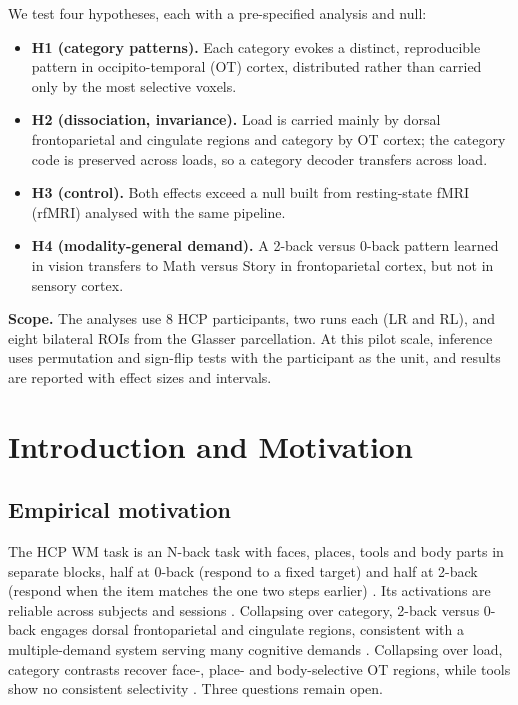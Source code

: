 \documentclass[conference]{IEEEtran}
\newcommand{\Nsub}{8}
\begin{document}
We test four hypotheses, each with a pre-specified analysis and null:
\begin{itemize}
\item \textbf{H1 (category patterns).} Each category evokes a distinct, reproducible pattern in occipito-temporal (OT) cortex, distributed rather than carried only by the most selective voxels.
\item \textbf{H2 (dissociation, invariance).} Load is carried mainly by dorsal frontoparietal and cingulate regions and category by OT cortex; the category code is preserved across loads, so a category decoder transfers across load.
\item \textbf{H3 (control).} Both effects exceed a null built from resting-state fMRI (rfMRI) analysed with the same pipeline.
\item \textbf{H4 (modality-general demand).} A 2-back versus 0-back pattern learned in vision transfers to Math versus Story in frontoparietal cortex, but not in sensory cortex.
\end{itemize}

\textbf{Scope.} The analyses use \Nsub{} HCP participants, two runs each (LR and RL), and eight bilateral ROIs from the Glasser parcellation. At this pilot scale, inference uses permutation and sign-flip tests with the participant as the unit, and results are reported with effect sizes and intervals.

\section{Introduction and Motivation}
\label{sec:intro}

\subsection{Empirical motivation}
The HCP WM task is an N-back task with faces, places, tools and body parts in separate blocks, half at 0-back (respond to a fixed target) and half at 2-back (respond when the item matches the one two steps earlier) \cite{vanessen2013,barch2013}. Its activations are reliable across subjects and sessions \cite{drobyshevsky2006,barch2013}. Collapsing over category, 2-back versus 0-back engages dorsal frontoparietal and cingulate regions, consistent with a multiple-demand system serving many cognitive demands \cite{duncan2010}. Collapsing over load, category contrasts recover face-, place- and body-selective OT regions, while tools show no consistent selectivity \cite{barch2013,kanwisher1997,epstein1998,downing2001}. Three questions remain open.
\end{document}
